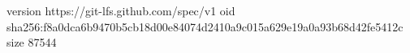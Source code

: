 version https://git-lfs.github.com/spec/v1
oid sha256:f8a0dca6b9470b5cb18d00e84074d2410a9c015a629e19a0a93b68d42fe5412c
size 87544
